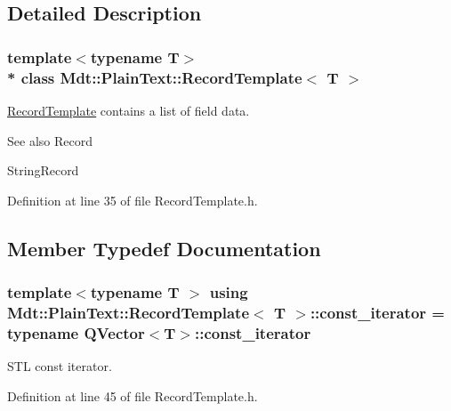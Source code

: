 \subsection{Detailed Description}
\subsubsection*{template$<$typename T$>$\\*
class Mdt\+::\+Plain\+Text\+::\+Record\+Template$<$ T $>$}

\hyperlink{class_mdt_1_1_plain_text_1_1_record_template}{Record\+Template} contains a list of field data. 

\begin{DoxySeeAlso}{See also}
Record 

String\+Record 
\end{DoxySeeAlso}


Definition at line 35 of file Record\+Template.\+h.



\subsection{Member Typedef Documentation}
\subsubsection[{\texorpdfstring{const\+\_\+iterator}{const_iterator}}]{\setlength{\rightskip}{0pt plus 5cm}template$<$typename T $>$ using {\bf Mdt\+::\+Plain\+Text\+::\+Record\+Template}$<$ T $>$\+::{\bf const\+\_\+iterator} =  typename Q\+Vector$<$T$>$\+::{\bf const\+\_\+iterator}}\hypertarget{class_mdt_1_1_plain_text_1_1_record_template_a3c5cf577c8412857077b2a1f9088c1ae}{}\label{class_mdt_1_1_plain_text_1_1_record_template_a3c5cf577c8412857077b2a1f9088c1ae}


S\+TL const iterator. 



Definition at line 45 of file Record\+Template.\+h.

